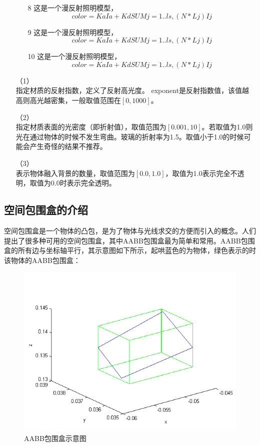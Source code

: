 \documentclass[10pt]{article}
\begin{document}
\begin{itemize}
\begin{itemize}
\item[8]{这是一个漫反射照明模型，}
$$color=KaIa+ Kd { SUM j=1..ls, (N * Lj)Ij }$$

\item[9]{这是一个漫反射照明模型，}
$$color=KaIa+ Kd { SUM j=1..ls, (N * Lj)Ij }$$

\item[10]{ 这是一个漫反射照明模型，}
$$color=KaIa+ Kd { SUM j=1..ls, (N * Lj)Ij }$$
\end{itemize}


\item[（1）]{}\\
指定材质的反射指数，定义了反射高光度。 exponent是反射指数值，该值越高则高光越密集，一般取值范围在$[0,1000]$。 

\item[（2）]{} \\
指定材质表面的光密度（即折射值），取值范围为$[0.001,10]$。若取值为1.0则光在通过物体的时候不发生弯曲。玻璃的折射率为1.5。取值小于1.0的时候可能会产生奇怪的结果不推荐。

\item[（3）]{}\\
表示物体融入背景的数量，取值范围为$[0.0,1.0]$，取值为1.0表示完全不透明，取值为0.0时表示完全透明。
\end{itemize}
\subsection{空间包围盒的介绍}
空间包围盒是一个物体的凸包，是为了物体与光线求交的方便而引入的概念。人们提出了很多种可用的空间包围盒，其中AABB包围盒最为简单和常用。AABB包围盒的所有边与坐标轴平行，其示意图如下所示，起哄蓝色的为物体，绿色表示的时该物体的AABB包围盒：
\begin{figure}[H]
\begin{center}
\includegraphics[scale=0.8]{AABB1.png}
\caption{AABB包围盒示意图}
\end{center}
\end{figure}
\end{document}
